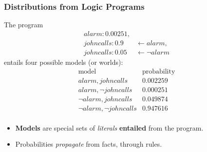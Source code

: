 \documentclass[bigger]{beamer}
\begin{document}
\begin{frame}
    \frametitle{Distributions from Logic Programs}
    \vfill
    The program
    $$
        \begin{aligned}
            alarm:0.00251, &                       \\
            johncalls:0.9  & \leftarrow alarm,     \\
            johncalls:0.05 & \leftarrow \neg alarm
        \end{aligned}
    $$
    entails four possible models (or worlds):
    $$
        \begin{array}{r|r}
            \text{model}               & \text{probability} \\
            \hline
            alarm, johncalls           & 0.002259   \\
            alarm, \neg johncalls      & 0.000251   \\
            \neg alarm, johncalls      & 0.049874   \\
            \neg alarm, \neg johncalls & 0.947616   \\
        \end{array}
    $$
    \begin{itemize}
        \item \alert{\textbf{Models}} are special sets of \emph{literals} \textbf{entailed} from the program.
        \item Probabilities \emph{propagate} from facts, through rules.
    \end{itemize}
    \vfill
\end{frame}
%
\end{document}
